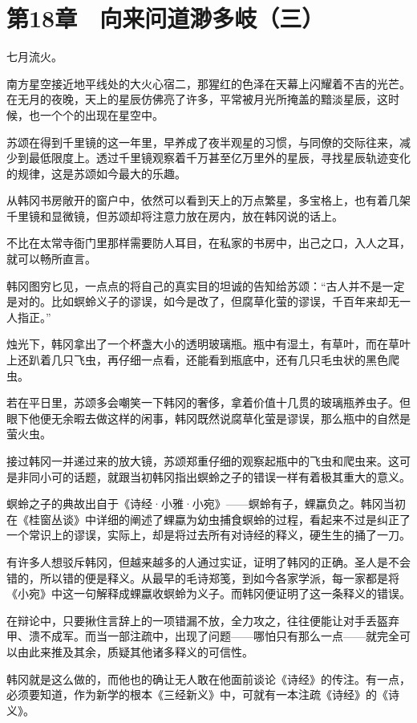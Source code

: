\section{第18章　向来问道渺多岐（三）}

七月流火。

南方星空接近地平线处的大火心宿二，那猩红的色泽在天幕上闪耀着不吉的光芒。在无月的夜晚，天上的星辰仿佛亮了许多，平常被月光所掩盖的黯淡星辰，这时候，也一个个的出现在星空中。

苏颂在得到千里镜的这一年里，早养成了夜半观星的习惯，与同僚的交际往来，减少到最低限度上。透过千里镜观察着千万甚至亿万里外的星辰，寻找星辰轨迹变化的规律，这是苏颂如今最大的乐趣。

从韩冈书房敞开的窗户中，依然可以看到天上的万点繁星，多宝格上，也有着几架千里镜和显微镜，但苏颂却将注意力放在房内，放在韩冈说的话上。

不比在太常寺衙门里那样需要防人耳目，在私家的书房中，出己之口，入人之耳，就可以畅所直言。

韩冈图穷匕见，一点点的将自己的真实目的坦诚的告知给苏颂：“古人并不是一定是对的。比如螟蛉义子的谬误，如今是改了，但腐草化萤的谬误，千百年来却无一人指正。”

烛光下，韩冈拿出了一个杯盏大小的透明玻璃瓶。瓶中有湿土，有草叶，而在草叶上还趴着几只飞虫，再仔细一点看，还能看到瓶底中，还有几只毛虫状的黑色爬虫。

若在平日里，苏颂多会嘲笑一下韩冈的奢侈，拿着价值十几贯的玻璃瓶养虫子。但眼下他便无余暇去做这样的闲事，韩冈既然说腐草化萤是谬误，那么瓶中的自然是萤火虫。

接过韩冈一并递过来的放大镜，苏颂郑重仔细的观察起瓶中的飞虫和爬虫来。这可是非同小可的话题，就跟当初韩冈指出螟蛉之子的错误一样有着极其重大的意义。

螟蛉之子的典故出自于《诗经·小雅·小宛》——螟蛉有子，蜾蠃负之。韩冈当初在《桂窗丛谈》中详细的阐述了蜾蠃为幼虫捕食螟蛉的过程，看起来不过是纠正了一个常识上的谬误，实际上，却是将过去所有对诗经的释义，硬生生的捅了一刀。

有许多人想驳斥韩冈，但越来越多的人通过实证，证明了韩冈的正确。圣人是不会错的，所以错的便是释义。从最早的毛诗郑笺，到如今各家学派，每一家都是将《小宛》中这一句解释成蜾蠃收螟蛉为义子。而韩冈便证明了这一条释义的错误。

在辩论中，只要揪住言辞上的一项错漏不放，全力攻之，往往便能让对手丢盔弃甲、溃不成军。而当一部注疏中，出现了问题——哪怕只有那么一点——就完全可以由此来推及其余，质疑其他诸多释义的可信性。

韩冈就是这么做的，而他也的确让无人敢在他面前谈论《诗经》的传注。有一点，必须要知道，作为新学的根本《三经新义》中，可就有一本注疏《诗经》的《诗义》。

